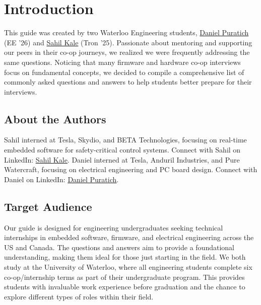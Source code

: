 \documentclass[main.tex]{subfiles}
\begin{document}
\section{Introduction}

This guide was created by two Waterloo Engineering students, \href{https://www.linkedin.com/in/danielpuratich}{Daniel Puratich} (EE '26) and \href{https://www.linkedin.com/in/sahil-kale}{Sahil Kale} (Tron '25). Passionate about mentoring and supporting our peers in their co-op journeys, we realized we were frequently addressing the same questions. Noticing that many firmware and hardware co-op interviews focus on fundamental concepts, we decided to compile a comprehensive list of commonly asked questions and answers to help students better prepare for their interviews.

\subsection{About the Authors}
Sahil interned at Tesla, Skydio, and BETA Technologies, focusing on real-time embedded software for safety-critical control systems. Connect with Sahil on LinkedIn: \textcolor{blue}{\underline{\href{https://www.linkedin.com/in/sahil-kale}{Sahil Kale}}}.
\newline
\newline
Daniel interned at Tesla, Anduril Industries, and Pure Watercraft, focusing on electrical engineering and PC board design. Connect with Daniel on LinkedIn: \textcolor{blue}{\underline{\href{https://www.linkedin.com/in/danielpuratich}{Daniel Puratich}}}.

\subsection{Target Audience}
Our guide is designed for engineering undergraduates seeking technical internships in embedded software, firmware, and electrical engineering across the US and Canada. The questions and answers aim to provide a foundational understanding, making them ideal for those just starting in the field.
\newline
\newline
\noindent We both study at the University of Waterloo, where all engineering students complete six co-op/internship terms as part of their undergraduate program. This provides students with invaluable work experience before graduation and the chance to explore different types of roles within their field.
\end{document}
